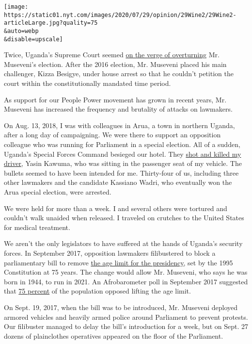 \texttt{[image: https://static01.nyt.com/images/2020/07/29/opinion/29Wine2/29Wine2-articleLarge.jpg?quality=75\\\&auto=webp\\\&disable=upscale]}

Twice, Uganda's Supreme Court seemed
\href{https://allafrica.com/stories/200105090061.html}{on the verge of
overturning} Mr. Museveni's election. After the 2016 election, Mr.
Museveni placed his main challenger, Kizza Besigye, under house arrest
so that he couldn't petition the court within the constitutionally
mandated time period.

As support for our People Power movement has grown in recent years, Mr.
Museveni has increased the frequency and brutality of attacks on
lawmakers.

On Aug. 13, 2018, I was with colleagues in Arua, a town in northern
Uganda, after a long day of campaigning. We were there to support an
opposition colleague who was running for Parliament in a special
election. All of a sudden, Uganda's Special Forces Command besieged our
hotel. They
\href{https://www.amnesty.org/en/latest/news/2018/08/uganda-investigate-death-of-opposition-politicians-driver/}{shot
and killed my driver,} Yasin Kawuma, who was sitting in the passenger
seat of my vehicle. The bullets seemed to have been intended for me.
Thirty-four of us, including three other lawmakers and the candidate
Kassiano Wadri, who eventually won the Arua special election, were
arrested.

We were held for more than a week. I and several others were tortured
and couldn't walk unaided when released. I traveled on crutches to the
United States for medical treatment.

We aren't the only legislators to have suffered at the hands of Uganda's
security forces. In September 2017, opposition lawmakers filibustered to
block a parliamentary bill to remove
\href{https://www.aljazeera.com/news/2017/09/uganda-introduces-bill-remove-presidential-age-limit-170927172204813.html}{the
age limit for the presidency}, set by the 1995 Constitution at 75 years.
The change would allow Mr. Museveni, who says he was born in 1944, to
run in 2021. An Afrobarometer poll in September 2017 suggested that
\href{https://www.nytimes.com/2017/12/20/world/africa/uganda-president-museveni-age-limit.html}{75
percent} of the population opposed lifting the age limit.

On Sept. 19, 2017, when the bill was to be introduced, Mr. Museveni
deployed armored vehicles and heavily armed police around Parliament to
prevent protests. Our filibuster managed to delay the bill's
introduction for a week, but on Sept. 27 dozens of plainclothes
operatives appeared on the floor of the Parliament.

